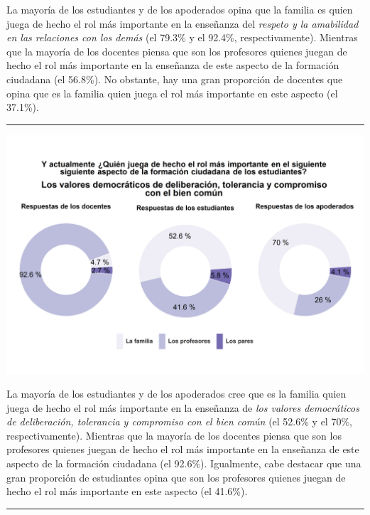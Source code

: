 \documentclass[
  14pt,
]{book}
\let\origfigure\figure
\let\endorigfigure\endfigure
\renewenvironment{figure}[1][2] {
  \expandafter\origfigure\expandafter[H]
} {
  \endorigfigure
}
\begin{document}
La mayoría de los estudiantes y de los apoderados opina que la familia es quien juega de hecho el rol más importante en la enseñanza del \emph{respeto y la amabilidad en las relaciones con los demás} (el 79.3\% y el 92.4\%, respectivamente). Mientras que la mayoría de los docentes piensa que son los profesores quienes juegan de hecho el rol más importante en la enseñanza de este aspecto de la formación ciudadana (el 56.8\%). No obstante, hay una gran proporción de docentes que opina que es la familia quien juega el rol más importante en este aspecto (el 37.1\%).

\begin{center}\rule{0.5\linewidth}{0.5pt}\end{center}

\begin{figure}[!ht]

{\centering \includegraphics[width=0.8\linewidth,]{images/graph_for_ciud8} 

}

\caption{Quién juega el rol más importante en los valores democráticos}\label{fig:unnamed-chunk-32}
\end{figure}

La mayoría de los estudiantes y de los apoderados cree que es la familia quien juega de hecho el rol más importante en la enseñanza de \emph{los valores democráticos de deliberación, tolerancia y compromiso con el bien común} (el 52.6\% y el 70\%, respectivamente). Mientras que la mayoría de los docentes piensa que son los profesores quienes juegan de hecho el rol más importante en la enseñanza de este aspecto de la formación ciudadana (el 92.6\%). Igualmente, cabe destacar que una gran proporción de estudiantes opina que son los profesores quienes juegan de hecho el rol más importante en este aspecto (el 41.6\%).

\begin{center}\rule{0.5\linewidth}{0.5pt}\end{center}
\end{document}
